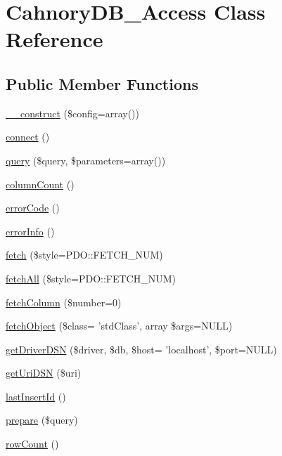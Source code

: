 \hypertarget{class_cahnory_d_b___access}{
\section{CahnoryDB\_\-Access Class Reference}
\label{class_cahnory_d_b___access}
}
\subsection*{Public Member Functions}
\begin{CompactItemize}
\item 
\hyperlink{class_cahnory_d_b___access_f7f9493844d2d66e924e3c1df51ce616}{\_\-\_\-construct} (\$config=array())
\item 
\hyperlink{class_cahnory_d_b___access_78572828d11dcdf2a498497d9001d557}{connect} ()
\item 
\hyperlink{class_cahnory_d_b___access_b696bd79e1b13e1310ed2d65da4f2658}{query} (\$query, \$parameters=array())
\item 
\hyperlink{class_cahnory_d_b___access_1cd0e18d5cc164a888f7bb39d5811dd6}{columnCount} ()
\item 
\hyperlink{class_cahnory_d_b___access_928a98b280c4dd8971ce6998eb157409}{errorCode} ()
\item 
\hyperlink{class_cahnory_d_b___access_c5230ce6cd46c5e922146a441d807877}{errorInfo} ()
\item 
\hyperlink{class_cahnory_d_b___access_61869dad7eba08b537578ad93c33d54b}{fetch} (\$style=PDO::FETCH\_\-NUM)
\item 
\hyperlink{class_cahnory_d_b___access_6b3091c2c795a88b8f41c53ea4ad63d8}{fetchAll} (\$style=PDO::FETCH\_\-NUM)
\item 
\hyperlink{class_cahnory_d_b___access_4094fc1094eb7d4dc260cd0d60dbf0bd}{fetchColumn} (\$number=0)
\item 
\hyperlink{class_cahnory_d_b___access_d12d0a7f82d9a44c94574703b7abdf65}{fetchObject} (\$class= 'stdClass', array \$args=NULL)
\item 
\hyperlink{class_cahnory_d_b___access_0696d53fd3702f7961a382e4f5bfb4ad}{getDriverDSN} (\$driver, \$db, \$host= 'localhost', \$port=NULL)
\item 
\hyperlink{class_cahnory_d_b___access_bb9efc1caeba4773a942907ef4e05cf4}{getUriDSN} (\$uri)
\item 
\hyperlink{class_cahnory_d_b___access_6384591ddfa09e979deb8a695bca0f67}{lastInsertId} ()
\item 
\hyperlink{class_cahnory_d_b___access_008a39a69d47048bd395c3c63c529ed5}{prepare} (\$query)
\item 
\hyperlink{class_cahnory_d_b___access_82b073888555fc72e57142fe913db377}{rowCount} ()
\end{CompactItemize}


